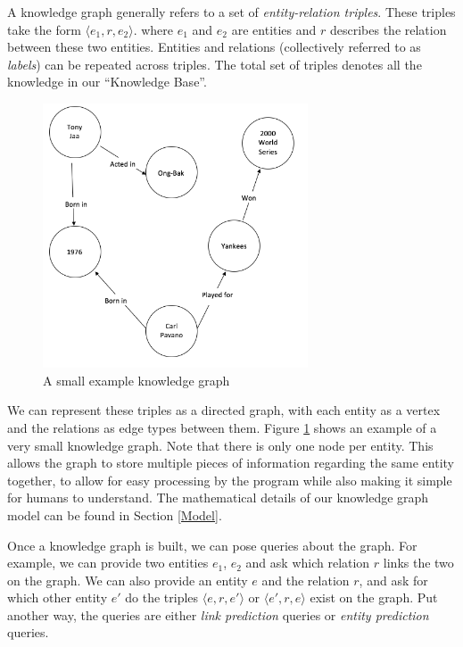 \documentclass[pageno]{final_paper}
\begin{document}
A knowledge graph generally refers to a set of \textit{entity-relation triples}.
These triples take the form $\langle e_1, r, e_2 \rangle$. where $e_1$ and $e_2$
are entities and $r$ describes the relation between these two entities. Entities
and relations (collectively referred to as \textit{labels}) can be repeated
across triples. The total set of triples denotes all the knowledge in our
``Knowledge Base''.

\begin{figure}[!tb]
    \centering
    \includegraphics[width=0.7\textwidth,keepaspectratio]{figures/Example_KG.png}
    \caption{A small example knowledge graph}
    \label{fig: KG}
\end{figure}

We can represent these triples as a directed graph, with each entity as a vertex
and the relations as edge types between them. Figure \ref{fig: KG} shows an
example of a very small knowledge graph. Note that there is only one node per
entity. This allows the graph to store multiple pieces of information regarding
the same entity together, to allow for easy processing by the program while also
making it simple for humans to understand. The mathematical details of our
knowledge graph model can be found in Section \ref{Model}.

Once a knowledge graph is built, we can pose queries about the graph. For
example, we can provide two entities $e_1$, $e_2$ and ask which relation $r$
links the two on the graph. We can also provide an entity $e$ and the relation
$r$, and ask for which other entity $e'$ do the triples $\langle e,r,e' \rangle$
or $\langle e',r,e \rangle$ exist on the graph. Put another way, the queries are
either \textit{link prediction} queries or \textit{entity prediction} queries.
\end{document}
